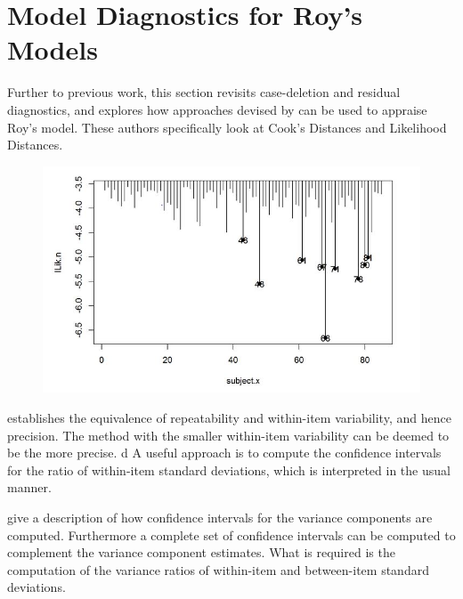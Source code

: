 \documentclass[12pt, a4paper]{report}
\theoremstyle{definition}
\theoremstyle{remark}
\begin{document}


\section{Model Diagnostics for Roy's Models}

Further to previous work, this section revisits case-deletion and residual diagnostics, and explores how approaches devised by  \citet{Galecki} can be used to appraise Roy's model. These authors specifically look at Cook's Distances and Likelihood Distances.
%	





\begin{figure}[h!]
	\centering
	\includegraphics[width=0.7\linewidth]{images/LogLik-JS-Roy}
	\caption{}
	\label{fig:LogLik-JS-Roy}                                                                                         
\end{figure}

         

                                                                       

\citet{ARoy2009} establishes the equivalence of repeatability and within-item variability, and hence precision.  The method with the smaller within-item variability can be deemed to be the more precise.                                              d
A useful approach is to compute the confidence intervals for the ratio of within-item standard deviations, which is interpreted in the usual manner.
%

\citet[pb 93-95]{PB} give a description of how confidence intervals for the variance components are computed. Furthermore a complete set of confidence intervals can be computed to complement the variance component estimates. What is required is the computation of the variance ratios of within-item and between-item standard deviations.
\end{document}
